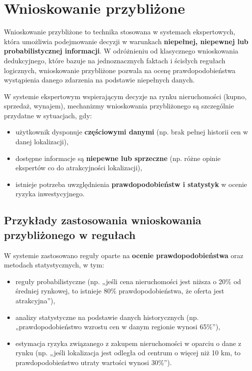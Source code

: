 \section{Wnioskowanie przybliżone}

Wnioskowanie przybliżone to technika stosowana w systemach ekspertowych, która umożliwia podejmowanie decyzji w warunkach \textbf{niepełnej, niepewnej lub probabilistycznej informacji}. W odróżnieniu od klasycznego wnioskowania dedukcyjnego, które bazuje na jednoznacznych faktach i ścisłych regułach logicznych, wnioskowanie przybliżone pozwala na ocenę prawdopodobieństwa wystąpienia danego zdarzenia na podstawie niepełnych danych.

W systemie ekspertowym wspierającym decyzje na rynku nieruchomości (kupno, sprzedaż, wynajem), mechanizmy wnioskowania przybliżonego są szczególnie przydatne w sytuacjach, gdy:
\begin{itemize}
    \item użytkownik dysponuje \textbf{częściowymi danymi} (np. brak pełnej historii cen w danej lokalizacji),
    \item dostępne informacje są \textbf{niepewne lub sprzeczne} (np. różne opinie ekspertów co do atrakcyjności lokalizacji),
    \item istnieje potrzeba uwzględnienia \textbf{prawdopodobieństw i statystyk} w ocenie ryzyka inwestycyjnego.
\end{itemize}

\subsection*{Przykłady zastosowania wnioskowania przybliżonego w regułach}

W systemie zastosowano reguły oparte na \textbf{ocenie prawdopodobieństwa} oraz metodach statystycznych, w tym:
\begin{itemize}
    \item reguły probabilistyczne (np. „jeśli cena nieruchomości jest niższa o 20\% od średniej rynkowej, to istnieje 80\% prawdopodobieństwa, że oferta jest atrakcyjna”),
    \item analizy statystyczne na podstawie danych historycznych (np. „prawdopodobieństwo wzrostu cen w danym regionie wynosi 65\%”),
    \item estymacja ryzyka związanego z zakupem nieruchomości w oparciu o dane z rynku (np. „jeśli lokalizacja jest odległa od centrum o więcej niż 10 km, to prawdopodobieństwo utraty wartości wynosi 30\%”).
\end{itemize}

